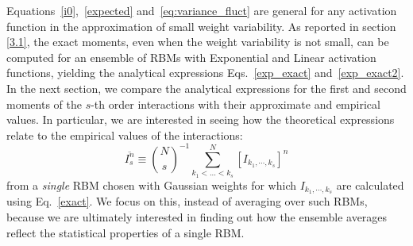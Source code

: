 \documentclass[11pt,letterpaper]{article}
\begin{document}
Equations~\eqref{i0},~\eqref{expected} and~\eqref{eq:variance_fluct} are general for any activation function in the approximation of small weight variability. As reported in section \ref{3.1}, the exact moments, even when the weight variability is not small, can be computed for an ensemble of RBMs with Exponential and Linear activation functions, yielding the analytical expressions Eqs.~\eqref{exp_exact} and~\eqref{exp_exact2}.\\
In the next section, we compare the analytical expressions for the first and second moments of the $s$-th order interactions with their approximate and empirical values. In particular, we are interested in seeing how the theoretical expressions relate to the empirical values of the interactions:
\begin{equation}
    \overline{ I_s^n} \equiv \binom{N}{s}^{-1}\sum_{k_{1}<...<k_{s}}^{N} \left[ {I_{k_{1},\cdots,k_{s}}}\right]^n
    \label{empirical}
\end{equation}
from a {\em single} RBM chosen with Gaussian weights for which $I_{k_{1},\cdots,k_{s}}$ are calculated using Eq.~\eqref{exact}. We focus on this, instead of averaging over such RBMs, because we are ultimately interested in finding out how the ensemble averages reflect the statistical properties of a single RBM. 
\end{document}
